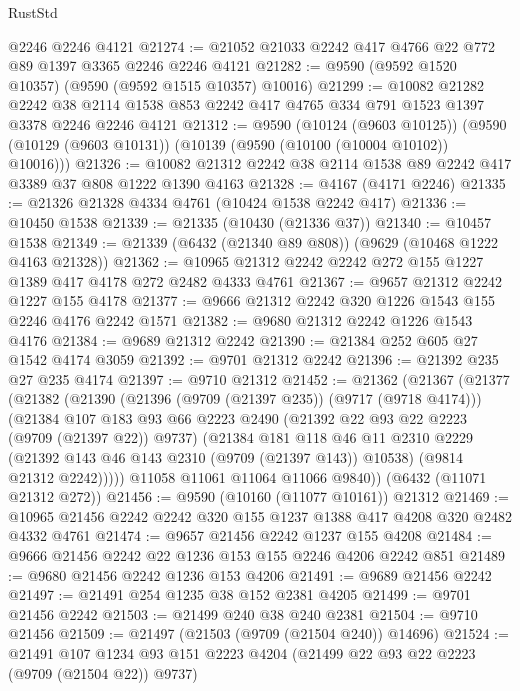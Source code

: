 \begin{lexlean}{RustStd}
\begin{coremodule}
    @2246
    @2246
    @4121
@21274 := @21052 @21033 @2242 @417 @4766 @22 @772 @89 @1397 @3365 @2246 @2246 @4121
@21282 := @9590 (@9592 @1520 @10357) (@9590 (@9592 @1515 @10357) @10016)
@21299 := @10082
    @21282
    @2242
    @38
    @2114
    @1538
    @853
    @2242
    @417
    @4765
    @334
    @791
    @1523
    @1397
    @3378
    @2246
    @2246
    @4121
@21312 := @9590
    (@10124 (@9603 @10125))
    (@9590 (@10129 (@9603 @10131)) (@10139 (@9590 (@10100 (@10004 @10102)) @10016)))
@21326 := @10082 @21312 @2242 @38 @2114 @1538 @89 @2242 @417 @3389 @37 @808 @1222 @1390 @4163
@21328 := @4167 (@4171 @2246)
@21335 := @21326 @21328 @4334 @4761 (@10424 @1538 @2242 @417)
@21336 := @10450 @1538
@21339 := @21335 (@10430 (@21336 @37))
@21340 := @10457 @1538
@21349 := @21339 (@6432 (@21340 @89 @808)) (@9629 (@10468 @1222 @4163 @21328))
@21362 := @10965 @21312 @2242 @2242 @272 @155 @1227 @1389 @417 @4178 @272 @2482 @4333 @4761
@21367 := @9657 @21312 @2242 @1227 @155 @4178
@21377 := @9666 @21312 @2242 @320 @1226 @1543 @155 @2246 @4176 @2242 @1571
@21382 := @9680 @21312 @2242 @1226 @1543 @4176
@21384 := @9689 @21312 @2242
@21390 := @21384 @252 @605 @27 @1542 @4174 @3059
@21392 := @9701 @21312 @2242
@21396 := @21392 @235 @27 @235 @4174
@21397 := @9710 @21312
@21452 := @21362
    (@21367
      (@21377
        (@21382
          (@21390
            (@21396 (@9709 (@21397 @235)) (@9717 (@9718 @4174)))
            (@21384
              @107
              @183
              @93
              @66
              @2223
              @2490
              (@21392 @22 @93 @22 @2223 (@9709 (@21397 @22)) @9737)
              (@21384
                @181
                @118
                @46
                @11
                @2310
                @2229
                (@21392 @143 @46 @143 @2310 (@9709 (@21397 @143)) @10538)
                (@9814 @21312 @2242)))))
        @11058
        @11061
        @11064
        @11066
        @9840))
    (@6432 (@11071 @21312 @272))
@21456 := @9590 (@10160 (@11077 @10161)) @21312
@21469 := @10965 @21456 @2242 @2242 @320 @155 @1237 @1388 @417 @4208 @320 @2482 @4332 @4761
@21474 := @9657 @21456 @2242 @1237 @155 @4208
@21484 := @9666 @21456 @2242 @22 @1236 @153 @155 @2246 @4206 @2242 @851
@21489 := @9680 @21456 @2242 @1236 @153 @4206
@21491 := @9689 @21456 @2242
@21497 := @21491 @254 @1235 @38 @152 @2381 @4205
@21499 := @9701 @21456 @2242
@21503 := @21499 @240 @38 @240 @2381
@21504 := @9710 @21456
@21509 := @21497 (@21503 (@9709 (@21504 @240)) @14696)
@21524 := @21491
    @107
    @1234
    @93
    @151
    @2223
    @4204
    (@21499 @22 @93 @22 @2223 (@9709 (@21504 @22)) @9737)

\end{coremodule}
\end{lexlean}
